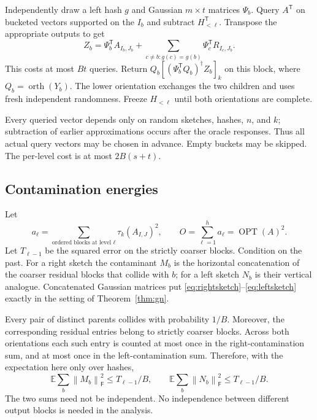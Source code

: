 \documentclass[11pt]{article}
\theoremstyle{remark}
\newcommand{\E}{\mathbb E}
\newcommand{\F}{\mathsf F}
\newcommand{\OPT}{\operatorname{OPT}}
\newcommand{\norm}[1]{\left\lVert #1\right\rVert}
\DeclareMathOperator{\orth}{orth}
\begin{document}
Independently draw a left hash $g$ and Gaussian $m\times t$ matrices
$\Psi_b$. Query $A^{\mathsf T}$ on bucketed vectors supported on the $I_b$
and subtract $H_{<\ell}^{\mathsf T}$. Transpose the appropriate outputs to get
\begin{equation}\label{eq:leftsketch}
 Z_b=\Psi_b^{\mathsf T}A_{I_b,J_b}+
      \sum_{c\ne b:g(c)=g(b)}\Psi_c^{\mathsf T}R_{I_c,J_b}.
\end{equation}
This costs at most $Bt$ queries. Return
$Q_b[(\Psi_b^{\mathsf T}Q_b)^\dagger Z_b]_k$ on this block, where
$Q_b=\orth(Y_b)$. The lower orientation exchanges the two children and uses
fresh independent randomness. Freeze $H_{<\ell}$ until both orientations
are complete.

Every queried vector depends only on random sketches, hashes, $n$, and $k$;
subtraction of earlier approximations occurs after the oracle responses.
Thus all actual query vectors may be chosen in advance. Empty buckets may
be skipped. The per-level cost is at most $2B(s+t)$.

\subsection{Contamination energies}

Let
\[
 a_\ell=\sum_{\text{ordered blocks at level }\ell}\tau_k(A_{I,J})^2,
 \qquad O=\sum_{\ell=1}^{h}a_\ell=\OPT(A)^2.
\]
Let $T_{\ell-1}$ be the squared error on the strictly coarser blocks.
Condition on the past. For a right sketch the contaminant $M_b$ is the
horizontal concatenation of the coarser residual blocks that collide with
$b$; for a left sketch $N_b$ is their vertical analogue. Concatenated
Gaussian matrices put \eqref{eq:rightsketch}--\eqref{eq:leftsketch} exactly
in the setting of Theorem~\ref{thm:gn}.

Every pair of distinct parents collides with probability $1/B$. Moreover,
the corresponding residual entries belong to strictly coarser blocks.
Across both orientations each such entry is counted at most once in the
right-contamination sum, and at most once in the left-contamination sum.
Therefore, with the expectation here only over hashes,
\begin{equation}\label{eq:contamination}
 \E\sum_b\norm{M_b}_\F^2\le T_{\ell-1}/B,
 \qquad
 \E\sum_b\norm{N_b}_\F^2\le T_{\ell-1}/B.
\end{equation}
The two sums need not be independent. No independence between different
output blocks is needed in the analysis.
\end{document}
